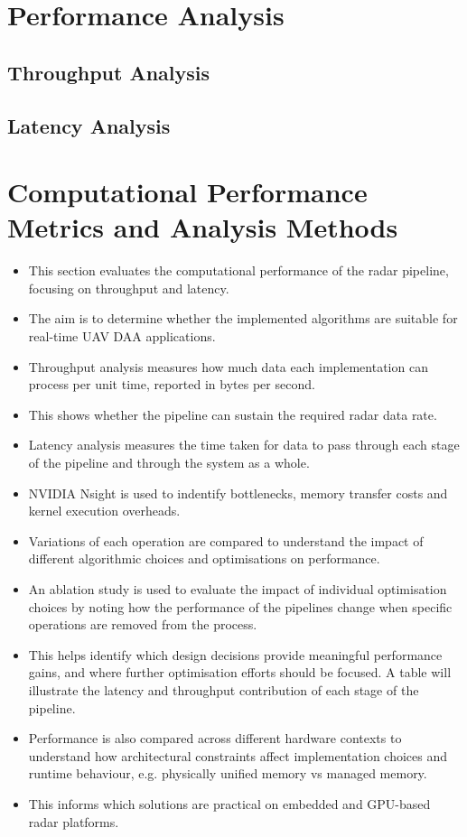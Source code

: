 \section{Performance Analysis}
\subsection{Throughput Analysis}
\subsection{Latency Analysis}


\section{Computational Performance Metrics and Analysis Methods}

\begin{itemize}
    \item This section evaluates the computational performance of the radar pipeline, focusing on throughput and latency.
    \item The aim is to determine whether the implemented algorithms are suitable for real-time UAV DAA applications.
    \item Throughput analysis measures how much data each implementation can process per unit time, reported in bytes per second.
    \item This shows whether the pipeline can sustain the required radar data rate.
    \item Latency analysis measures the time taken for data to pass through each stage of the pipeline and through the system as a whole.
    \item NVIDIA Nsight is used to indentify bottlenecks, memory transfer costs and kernel execution overheads.
    \item Variations of each operation are compared to understand the impact of different algorithmic choices and optimisations on performance. 
    \item An ablation study is used to evaluate the impact of individual optimisation choices by noting how the performance of the pipelines change when specific operations are removed from the process.
    \item This helps identify which design decisions provide meaningful performance gains, and where further optimisation efforts should be focused. A table will illustrate the latency and throughput contribution of each stage of the pipeline.  
    \item Performance is also compared across different hardware contexts to understand how architectural constraints affect implementation choices and runtime behaviour, e.g. physically unified memory vs managed memory.
    \item This informs which solutions are practical on embedded and GPU-based radar platforms.
\end{itemize}